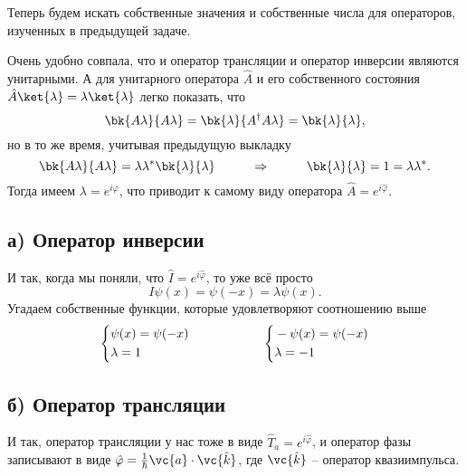 Теперь будем искать собственные значения и собственные числа для операторов, изученных в предыдущей задаче.

Очень удобно совпала, что и оператор трансляции и оператор инверсии являются унитарными. А для унитарного оператора $\hat{A}$ и его собственного состояния $\hat{A} \ket{\lambda} = \lambda \ket{\lambda}$ легко показать, что
\begin{equation*}
\bk{A \lambda}{A \lambda} = \bk{\lambda}{A^\dagger A \lambda} = \bk{\lambda}{\lambda},
\end{equation*}
но в то же время, учитывая предыдущую выкладку
\begin{equation*}
	\bk{A \lambda}{A \lambda} = \lambda \lambda^*\bk{\lambda}{\lambda}
	\hspace{1 cm}
	\Rightarrow
	\hspace{1 cm}
	\bk{\lambda}{\lambda} = 1 = \lambda \lambda^*.
\end{equation*}
Тогда имеем $\lambda = e^{i \varphi}$, что приводит к самому виду оператора $\hat{A} = e^{i \hat{\varphi}}$.
\subsection*{а) Оператор инверсии}
И так, когда мы поняли, что $\hat{I} = e ^{i \hat{\varphi}}$, то уже всё просто
\begin{equation*}
	I \psi(x) = \psi(-x) = \lambda \psi(x).
\end{equation*}
Угадаем собственные функции, которые удовлетворяют соотношению выше 
\begin{equation*}
	\left\{\begin{aligned}
		&\psi(x) = \psi(-x)\\
		&\lambda = 1
	\end{aligned}\right.
	\hspace{2 cm}
	\left\{\begin{aligned}
		&- \psi(x) = \psi(-x)\\
		&\lambda = -1
	\end{aligned}\right.
\end{equation*}
\subsection*{б) Оператор трансляции}
И так, оператор трансляции у нас тоже в виде $\hat{T}_a = e^{i \hat{\varphi}}$, и оператор фазы записывают в виде $\hat{\varphi} = \frac{1}{\hbar} \vc{a} \cdot \vc{\hat{k}}$, где $\vc{\hat{k}}$ -- оператор квазиимпульса.


